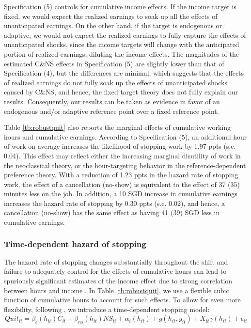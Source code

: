 \documentclass[reviewmode,AEJ]{AEA}
\begin{document}
Specification (5) controls for cumulative income effects. If the income target is fixed, we would expect the realized earnings to soak up all the effects of unanticipated earnings. On the other hand, if the target is endogenous or adaptive, we would not expect the realized earnings to fully capture the effects of unanticipated shocks, since the income targets will change with the anticipated portion of realized earnings, diluting the income effects. The magnitudes of the estimated C\&NS effects in Specification (5) are slightly lower than that of Specification (4), but the differences 
are minimal, which suggests that the effects of realized earnings do not fully soak up the effects of unanticipated shocks caused by C\&NS, and hence, the fixed target theory does not fully explain our results. Consequently, our results can be taken as evidence in favor of an endogenous and/or adaptive reference point over a fixed reference point. 


Table \ref{tb:robustquit} also reports the marginal effects of cumulative working hours and cumulative earnings. According to Specification (5), an additional hour of work on average increases the likelihood of stopping work by 1.97 ppts (s.e. 0.04). This effect may reflect either the increasing marginal disutility of work in the neoclassical theory, or the hour-targeting behavior in the reference-dependent preference theory. With a reduction of 1.23 ppts in the hazard rate of stopping work, the effect of a cancellation (no-show) is equivalent to the effect of 37 (35) minutes less on the job. %
In addition, a 10 SGD increase in cumulative earnings increases the hazard rate of stopping by 0.30 ppts (s.e. 0.02), and hence, a cancellation (no-show) has the same effect as having 41 (39) SGD less in cumulative earnings.%

\subsubsection{Time-dependent hazard of stopping}
The hazard rate of stopping changes substantially throughout the shift and failure to adequately control for the effects of cumulative hours can lead to spuriously significant estimates of the income effect due to strong correlation between hours and income%
. In Table \ref{tb:robustquit}, we use a flexible cubic function of cumulative hours to account for such effects. To allow for even more flexibility, following \cite{thakral2018daily}, we introduce a time-dependent stopping model:
\begin{equation}
\label{eq:lwr}
    Quit_{it} = \beta_c(h_{it})C_{it} + \beta_{ns}(h_{it}){NS}_{it} + \alpha_i(h_{it}) + g(h_{it}, y_{it}) + X_{it}\gamma(h_{it}) + \epsilon_{it}
\end{equation}
\end{document}
